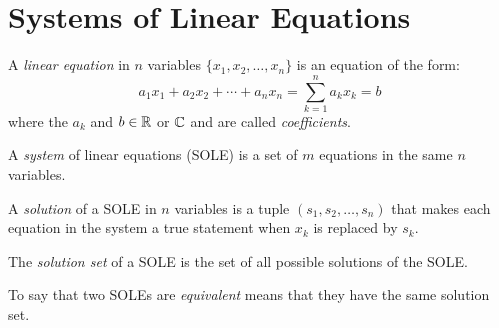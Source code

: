 \documentclass[letterpaper,12pt,fleqn]{article}
\begin{document}
\section*{Systems of Linear Equations}

\begin{definition}
  A \emph{linear equation} in $n$ variables $\{x_1,x_2,\ldots,x_n\}$ is an
  equation of the form:
  \[a_1x_1+a_2x_2+\cdots+a_nx_n=\sum_{k=1}^na_kx_k=b\]
  where the $a_k$ and $b\in\mathbb{R}$ or $\mathbb{C}$ and are called \emph{coefficients}.

  A \emph{system} of linear equations (SOLE) is a set of $m$ equations in the
  same $n$ variables.
\end{definition}

\begin{definition}
  A \emph{solution} of a SOLE in $n$ variables is a tuple
  $(s_1,s_2,\ldots,s_n)$ that makes each equation in the system a true
  statement when $x_k$ is replaced by $s_k$.

  The \emph{solution set} of a SOLE is the set of all possible solutions of the
  SOLE.

  To say that two SOLEs are \emph{equivalent} means that they have the same
  solution set.
\end{definition}
\end{document}
